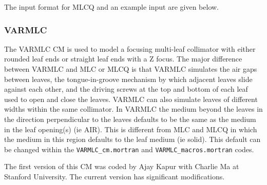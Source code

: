 \documentclass[12pt,twoside]{article}
\begin{document}

\clearpage

The input format for MLCQ and an example input are given below.
\begin{small}

\end{small}


\clearpage


\subsubsection{VARMLC}
\label{varmlc}
\renewcommand{\rightmark}{VARMLC CM}
The VARMLC CM is used to model a focusing multi-leaf collimator
with either rounded leaf
ends or straight leaf ends with a Z focus.  The major difference between
VARMLC and MLC or MLCQ is that
VARMLC simulates the air gaps between leaves, the tongue-in-groove
mechanism by which adjacent leaves slide against each other, and the
driving screws at the top and bottom of each leaf used to open and close
the leaves.  VARMLC can also simulate leaves of different widths within
the same collimator.
In VARMLC the medium beyond the leaves in the direction perpendicular
to the leaves defaults to be the same as the medium in the leaf opening(s)
(ie AIR).  This is different from MLC and MLCQ in which the medium in this
region defaults to the leaf medium (ie solid).  This default can be changed
within the {\tt VARMLC\_cm.mortran} and {\tt VARMLC\_macros.mortran} codes.

The first version of this CM was coded by Ajay Kapur with Charlie Ma
at Stanford University.  The current version has significant
modifications.
\end{document}
